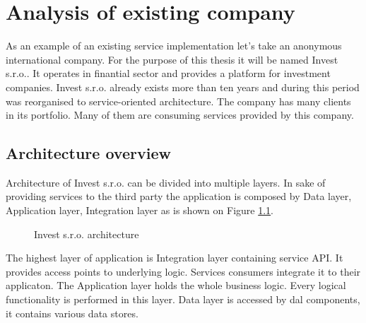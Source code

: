 \chapter{Analysis of existing company}

As an example of an existing service implementation let's take an anonymous international company. For the purpose of this thesis it will be named Invest s.r.o.. It operates in finantial sector and provides a platform for investment companies. Invest s.r.o. already exists more than ten years and during this period was reorganised to service-oriented architecture. The company has many clients in its portfolio. Many of them are consuming services provided by this company.

\section{Architecture overview}
Architecture of Invest s.r.o. can be divided into multiple layers. In sake of providing services to the third party the application is composed by Data layer, Application layer, Integration layer as is shown on Figure \ref{fig:invest-architecture}.

\begin{figure}[htp] 
\caption{Invest s.r.o. architecture}
\label{fig:invest-architecture}
\end{figure} 

The highest layer of application is Integration layer containing service API. It provides access points to underlying logic. Services consumers integrate it to their applicaton. The Application layer holds the whole business logic. Every logical functionality is performed in this layer. Data layer is accessed by \gls{dal} components, it contains various data stores.

